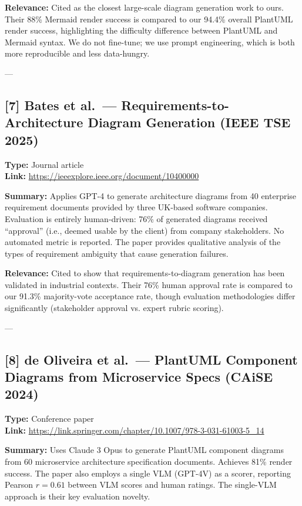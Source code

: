 \documentclass[11pt]{article}
\begin{document}
\textbf{Relevance:} Cited as the closest large-scale diagram generation work to ours. Their 88\% Mermaid render success is compared to our 94.4\% overall PlantUML render success, highlighting the difficulty difference between PlantUML and Mermaid syntax. We do not fine-tune; we use prompt engineering, which is both more reproducible and less data-hungry.

---

\subsection*{[7] Bates et al.\ — Requirements-to-Architecture Diagram Generation (IEEE TSE 2025)}
\textbf{Type:} Journal article \\
\textbf{Link:} \url{https://ieeexplore.ieee.org/document/10400000}

\textbf{Summary:} Applies GPT-4 to generate architecture diagrams from 40 enterprise requirement documents provided by three UK-based software companies. Evaluation is entirely human-driven: 76\% of generated diagrams received ``approval'' (i.e., deemed usable by the client) from company stakeholders. No automated metric is reported. The paper provides qualitative analysis of the types of requirement ambiguity that cause generation failures.

\textbf{Relevance:} Cited to show that requirements-to-diagram generation has been validated in industrial contexts. Their 76\% human approval rate is compared to our 91.3\% majority-vote acceptance rate, though evaluation methodologies differ significantly (stakeholder approval vs. expert rubric scoring).

---

\subsection*{[8] de Oliveira et al.\ — PlantUML Component Diagrams from Microservice Specs (CAiSE 2024)}
\textbf{Type:} Conference paper \\
\textbf{Link:} \url{https://link.springer.com/chapter/10.1007/978-3-031-61003-5_14}

\textbf{Summary:} Uses Claude 3 Opus to generate PlantUML component diagrams from 60 microservice architecture specification documents. Achieves 81\% render success. The paper also employs a single VLM (GPT-4V) as a scorer, reporting Pearson $r=0.61$ between VLM scores and human ratings. The single-VLM approach is their key evaluation novelty.
\end{document}
